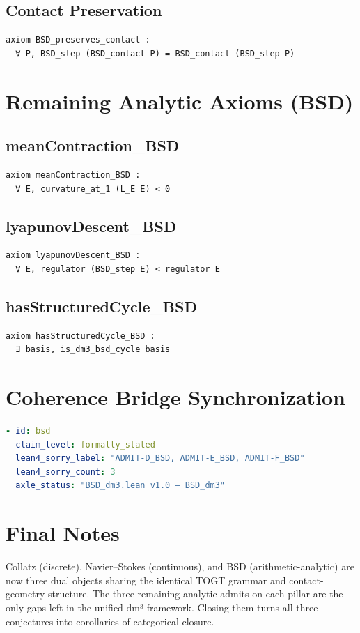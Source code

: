 \documentclass[11pt,a4paper]{article}
\begin{document}
\subsection{Contact Preservation}
\begin{lstlisting}
axiom BSD_preserves_contact :
  ∀ P, BSD_step (BSD_contact P) = BSD_contact (BSD_step P)
\end{lstlisting}

\section{Remaining Analytic Axioms (BSD)}

\subsection{meanContraction\_BSD}
\begin{lstlisting}
axiom meanContraction_BSD :
  ∀ E, curvature_at_1 (L_E E) < 0
\end{lstlisting}

\subsection{lyapunovDescent\_BSD}
\begin{lstlisting}
axiom lyapunovDescent_BSD :
  ∀ E, regulator (BSD_step E) < regulator E
\end{lstlisting}

\subsection{hasStructuredCycle\_BSD}
\begin{lstlisting}
axiom hasStructuredCycle_BSD :
  ∃ basis, is_dm3_bsd_cycle basis
\end{lstlisting}

\section{Coherence Bridge Synchronization}

\begin{lstlisting}[language=YAML]
- id: bsd
  claim_level: formally_stated
  lean4_sorry_label: "ADMIT-D_BSD, ADMIT-E_BSD, ADMIT-F_BSD"
  lean4_sorry_count: 3
  axle_status: "BSD_dm3.lean v1.0 — BSD_dm3"
\end{lstlisting}

\section{Final Notes}

Collatz (discrete), Navier–Stokes (continuous), and BSD (arithmetic-analytic) are now three dual objects sharing the identical TOGT grammar and contact-geometry structure. The three remaining analytic admits on each pillar are the only gaps left in the unified dm³ framework. Closing them turns all three conjectures into corollaries of categorical closure.
\end{document}
